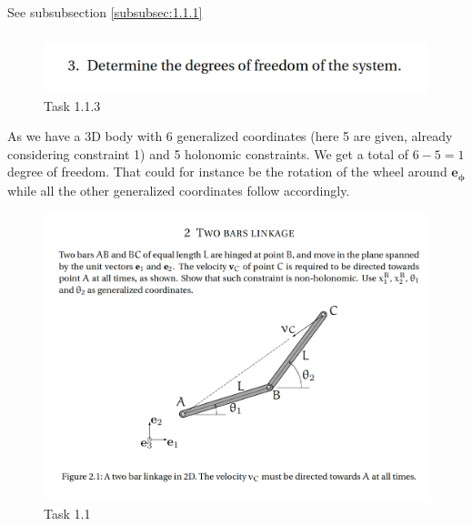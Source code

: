 \subsubsection{}
See subsubsection \ref{subsubsec:1.1.1}
\subsubsection{}

\begin{figure}[ht]
    \centering
    \includegraphics[scale=0.4]{images/1.1.3.png}
    \caption{Task 1.1.3}
    \label{fig:task1.1.3}
\end{figure}

\noindent As we have a 3D body with 6 generalized coordinates (here 5 are given, already considering constraint 1) and 5 holonomic constraints. We get a total of $6 - 5 = 1$ degree of freedom. That could for instance be the rotation of the wheel around $\boldsymbol{e_\phi}$ while all the other generalized coordinates follow accordingly.

\clearpage

\begin{figure}[ht]
    \centering
    \includegraphics[scale=0.4]{images/1.2.png}
    \caption{Task 1.1}
    \label{fig:task1.2}
\end{figure}
\subsection{}\label{subsec:1.2}

